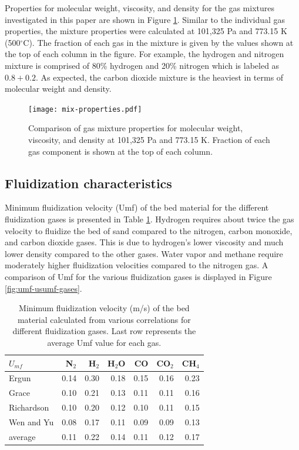 Properties for molecular weight, viscosity, and density for the gas mixtures investigated in this paper are shown in Figure \ref{fig:mix-properties}. Similar to the individual gas properties, the mixture properties were calculated at 101,325 Pa and 773.15 K (500$^\circ$C). The fraction of each gas in the mixture is given by the values shown at the top of each column in the figure. For example, the hydrogen and nitrogen mixture is comprised of 80\% hydrogen and 20\% nitrogen which is labeled as $0.8 + 0.2$. As expected, the carbon dioxide mixture is the heaviest in terms of molecular weight and density.

\begin{figure}[H]
    \centering
    \texttt{[image: mix-properties.pdf]}
    \caption{Comparison of gas mixture properties for molecular weight, viscosity, and density at 101,325 Pa and 773.15 K. Fraction of each gas component is shown at the top of each column.}
    \label{fig:mix-properties}
\end{figure}


\subsection{Fluidization characteristics}

Minimum fluidization velocity (Umf) of the bed material for the different fluidization gases is presented in Table \ref{tab:umf-sand}. Hydrogen requires about twice the gas velocity to fluidize the bed of sand compared to the nitrogen, carbon monoxide, and carbon dioxide gases. This is due to hydrogen's lower viscosity and much lower density compared to the other gases. Water vapor and methane require moderately higher fluidization velocities compared to the nitrogen gas. A comparison of Umf for the various fluidization gases is displayed in Figure \ref{fig:umf-usumf-gases}.

\begin{table}[H]
    \centering
    \caption{Minimum fluidization velocity (m/s) of the bed material calculated from various correlations for different fluidization gases. Last row represents the average Umf value for each gas.}
    \label{tab:umf-sand}
    \begin{tabular}{lrrrrrr}
        \toprule
        $U_{mf}$ & N$_2$ & H$_2$ & H$_2$O & CO & CO$_2$ & CH$_4$ \\
        \midrule
        Ergun       & 0.14 & 0.30 & 0.18 & 0.15 & 0.16 & 0.23 \\
        Grace       & 0.10 & 0.21 & 0.13 & 0.11 & 0.11 & 0.16 \\
        Richardson  & 0.10 & 0.20 & 0.12 & 0.10 & 0.11 & 0.15 \\
        Wen and Yu  & 0.08 & 0.17 & 0.11 & 0.09 & 0.09 & 0.13 \\
        average     & 0.11 & 0.22 & 0.14 & 0.11 & 0.12 & 0.17 \\
        \bottomrule
    \end{tabular}
\end{table}

